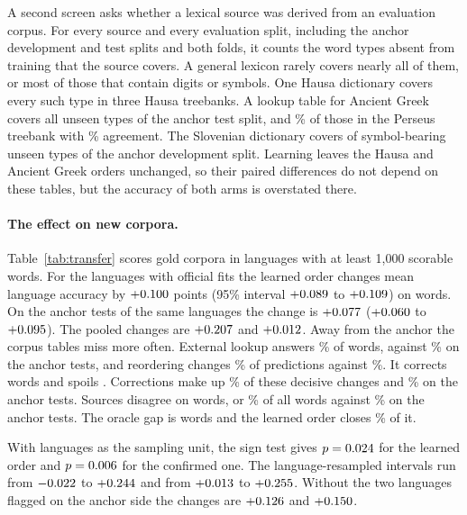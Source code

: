\documentclass[11pt]{article}
\begin{document}
A second screen asks whether a lexical source was derived from an evaluation
corpus. For every source and every evaluation split, including the anchor
development and test splits and both folds, it counts the word types absent
from training that the source covers. A general lexicon rarely covers
nearly all of them, or most of those that contain digits or symbols. One
Hausa dictionary covers every such type in three Hausa treebanks. A lookup
table for Ancient Greek covers all \trGrcTypes{} unseen types of the anchor
test split, and \trPerseusCover\% of those in the Perseus treebank with
\trPerseusAgree\% agreement. The Slovenian dictionary covers
\anSlvMarkedCovered{} of \anSlvMarked{} symbol-bearing unseen types of the
anchor development split. Learning leaves the Hausa and Ancient Greek
orders unchanged, so their paired differences do not depend on these
tables, but the accuracy of both arms is overstated there.

\paragraph{The effect on new corpora.}
Table~\ref{tab:transfer} scores \trGoldCorpora{} gold corpora in \trLang{}
languages with at least 1,000 scorable words. For the \trOffLang{} languages
with official fits the learned order changes mean language accuracy by
\(+0.100\) points (95\% interval \(+0.089\) to \(+0.109\)) on
\trOffN{} words. On the anchor tests of the same languages the change is
\(+0.077\) (\(+0.060\) to \(+0.095\)). The pooled changes are
\(+0.207\) and \(+0.012\). Away from the anchor the corpus
tables miss more often. External lookup answers \trOffExtShare\% of words,
against \trHomeExtShare\% on the anchor tests, and reordering changes
\trOffChangedShare\% of predictions against \trHomeChangedShare\%. It
corrects \trOffCorr{} words and spoils \trOffReg. Corrections make up
\trOffWinShare\% of these decisive changes and \trHomeWinShare\% on the
anchor tests. Sources disagree on \atDisputed{} words, or \atDisputedShare\%
of all words against \anDisputedShare\% on the anchor tests. The oracle gap
is \atGap{} words and the learned order closes \atRealized\% of it.

With languages as the sampling unit, the sign test gives \(p=0.024\)
for the learned order and \(p=0.006\) for the confirmed one. The
language-resampled intervals run from \(-0.022\) to \(+0.244\) and
from \(+0.013\) to \(+0.255\). Without the two languages
flagged on the anchor side the changes are \(+0.126\) and
\(+0.150\).
\end{document}
